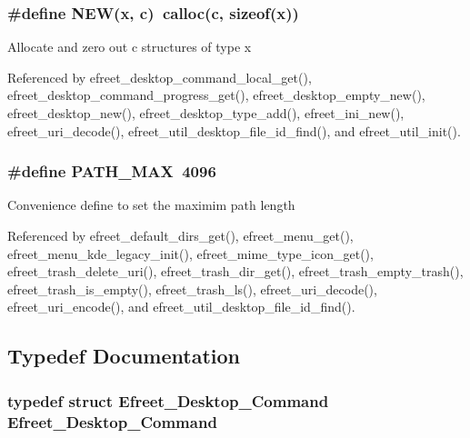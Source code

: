 \subsubsection[NEW]{\setlength{\rightskip}{0pt plus 5cm}\#define NEW(x, \/  c)~calloc(c, sizeof(x))}\label{group__Efreet__Private_g1bf6c092db09b704eec6aa39b578ca6a}


Allocate and zero out c structures of type x 

Referenced by efreet\_\-desktop\_\-command\_\-local\_\-get(), efreet\_\-desktop\_\-command\_\-progress\_\-get(), efreet\_\-desktop\_\-empty\_\-new(), efreet\_\-desktop\_\-new(), efreet\_\-desktop\_\-type\_\-add(), efreet\_\-ini\_\-new(), efreet\_\-uri\_\-decode(), efreet\_\-util\_\-desktop\_\-file\_\-id\_\-find(), and efreet\_\-util\_\-init().
\subsubsection[PATH\_\-MAX]{\setlength{\rightskip}{0pt plus 5cm}\#define PATH\_\-MAX~4096}\label{group__Efreet__Private_ge688d728e1acdfe5988c7db45d6f0166}


Convenience define to set the maximim path length 

Referenced by efreet\_\-default\_\-dirs\_\-get(), efreet\_\-menu\_\-get(), efreet\_\-menu\_\-kde\_\-legacy\_\-init(), efreet\_\-mime\_\-type\_\-icon\_\-get(), efreet\_\-trash\_\-delete\_\-uri(), efreet\_\-trash\_\-dir\_\-get(), efreet\_\-trash\_\-empty\_\-trash(), efreet\_\-trash\_\-is\_\-empty(), efreet\_\-trash\_\-ls(), efreet\_\-uri\_\-decode(), efreet\_\-uri\_\-encode(), and efreet\_\-util\_\-desktop\_\-file\_\-id\_\-find().

\subsection{Typedef Documentation}
\subsubsection[Efreet\_\-Desktop\_\-Command]{\setlength{\rightskip}{0pt plus 5cm}typedef struct {\bf Efreet\_\-Desktop\_\-Command} {\bf Efreet\_\-Desktop\_\-Command}}\label{group__Efreet__Private_gfd1661785cd9826c8b66c511100bfec5}


